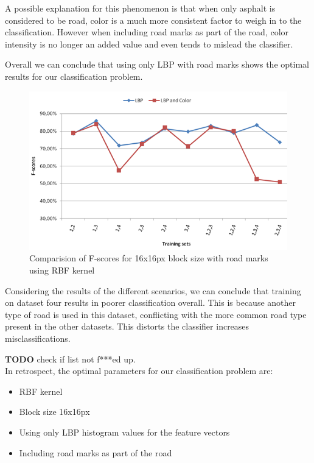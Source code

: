 \documentclass[runningheads,a4paper]{llncs}
\begin{document}
A possible explanation for this phenomenon is that when only asphalt is considered to be road, color is a much more consistent factor to weigh in to the classification. However when including road marks as part of the road, color intensity is no longer an added value and even tends to mislead the classifier. 

Overall we can conclude that using only LBP with road marks shows the optimal results for our classification problem. 

\begin{figure}[h]
\centering
\includegraphics[width=\textwidth]{fig/16_wi_roadmarks.png}
\caption{Comparision of F-scores for 16x16px block size with road marks using RBF kernel }
\label{fig:16_wi_roadmarks}
\end{figure}

Considering the results of the different scenarios, we can conclude that training on dataset four results in poorer classification overall. This is because another type of road is used in this dataset, conflicting with the more common road type present in the other datasets. This distorts the classifier increases misclassifications.

\textbf{TODO} check if list not f***ed up.\\
\noindent In retrospect, the optimal parameters for our classification problem are:
\begin{itemize}
\item RBF kernel
\item Block size 16x16px
\item Using only LBP histogram values for the feature vectors
\item Including road marks as part of the road  
\end{itemize}
\end{document}
